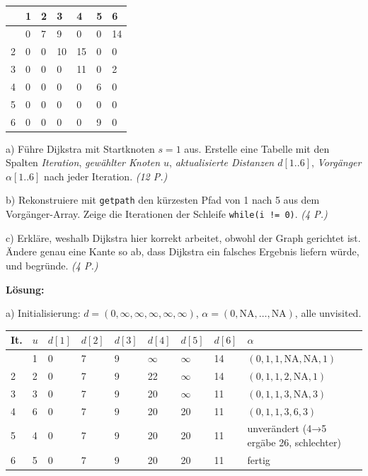 \documentclass[11pt, a4paper]{article}
\begin{document}
{\footnotesize
\begin{tabularx}{\linewidth}{XXXXXXX}
\hline
\rowcolor{tableheadbg}
{\color{white}\textbf{}} & {\color{white}\textbf{1}} & {\color{white}\textbf{2}} & {\color{white}\textbf{3}} & {\color{white}\textbf{4}} & {\color{white}\textbf{5}} & {\color{white}\textbf{6}} \\[2pt]
\hline
\endhead
\hline
\endfoot
1 & 0 & 7 & 9 & 0 & 0 & 14 \\
2 & 0 & 0 & 10 & 15 & 0 & 0 \\
3 & 0 & 0 & 0 & 11 & 0 & 2 \\
4 & 0 & 0 & 0 & 0 & 6 & 0 \\
5 & 0 & 0 & 0 & 0 & 0 & 0 \\
6 & 0 & 0 & 0 & 0 & 9 & 0 \\
\end{tabularx}
}


a) Führe Dijkstra mit Startknoten $s=1$ aus. Erstelle eine Tabelle mit den Spalten \textit{Iteration}, \textit{gewählter Knoten $u$}, \textit{aktualisierte Distanzen $d[1..6]$}, \textit{Vorgänger $\alpha[1..6]$} nach jeder Iteration. \textit{(12 P.)}


b) Rekonstruiere mit \texttt{getpath} den kürzesten Pfad von 1 nach 5 aus dem Vorgänger-Array. Zeige die Iterationen der Schleife \texttt{while(i != 0)}. \textit{(4 P.)}


c) Erkläre, weshalb Dijkstra hier korrekt arbeitet, obwohl der Graph gerichtet ist. Ändere genau eine Kante so ab, dass Dijkstra ein falsches Ergebnis liefern würde, und begründe. \textit{(4 P.)}


\textbf{Lösung:}


a) Initialisierung: $d=(0,\infty,\infty,\infty,\infty,\infty)$, $\alpha=(0,\text{NA},\dots,\text{NA})$, alle unvisited.



\begin{landscape}

{\footnotesize
\begin{tabularx}{\linewidth}{XXXXXXXXX}
\hline
\rowcolor{tableheadbg}
{\color{white}\textbf{It.}} & {\color{white}\textbf{$u$}} & {\color{white}\textbf{$d[1]$}} & {\color{white}\textbf{$d[2]$}} & {\color{white}\textbf{$d[3]$}} & {\color{white}\textbf{$d[4]$}} & {\color{white}\textbf{$d[5]$}} & {\color{white}\textbf{$d[6]$}} & {\color{white}\textbf{$\alpha$}} \\[2pt]
\hline
\endhead
\hline
\endfoot
1 & 1 & 0 & 7 & 9 & $\infty$ & $\infty$ & 14 & $(0,1,1,\text{NA},\text{NA},1)$ \\
2 & 2 & 0 & 7 & 9 & 22 & $\infty$ & 14 & $(0,1,1,2,\text{NA},1)$ \\
3 & 3 & 0 & 7 & 9 & 20 & $\infty$ & 11 & $(0,1,1,3,\text{NA},3)$ \\
4 & 6 & 0 & 7 & 9 & 20 & 20 & 11 & $(0,1,1,3,6,3)$ \\
5 & 4 & 0 & 7 & 9 & 20 & 20 & 11 & unverändert (4→5 ergäbe 26, schlechter) \\
6 & 5 & 0 & 7 & 9 & 20 & 20 & 11 & fertig \\
\end{tabularx}
}
\end{landscape}
\end{document}
